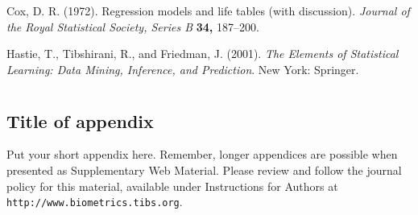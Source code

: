 \documentclass[useAMS,referee]{biom}
\begin{document}

\begin{thebibliography}{}

\bibitem{ } Cox, D. R. (1972). Regression models and life tables (with
discussion).  \textit{Journal of the Royal Statistical Society, Series B}
\textbf{34,} 187--200.

\bibitem{ }  Hastie, T., Tibshirani, R., and Friedman, J. (2001). \textit{The 
Elements of Statistical Learning: Data Mining, Inference, and Prediction}.
New York: Springer.

\end{thebibliography}

\appendix


\section{}
\subsection{Title of appendix}

Put your short appendix here.  Remember, longer appendices are
possible when presented as Supplementary Web Material.  Please 
review and follow the journal policy for this material, available
under Instructions for Authors at \texttt{http://www.biometrics.tibs.org}.

\label{lastpage}
\end{document}
